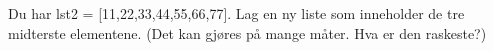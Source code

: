 %
%
Du har lst2 = [11,22,33,44,55,66,77]. Lag en ny liste som inneholder de tre midterste elementene. (Det kan gjøres på mange måter. Hva er den raskeste?)
